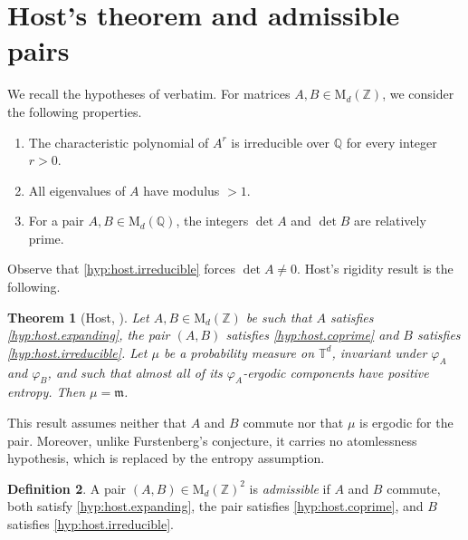 \documentclass[11pt,reqno]{amsart}
\theoremstyle{plain}
\newtheorem{thm}{Theorem}[section]
\theoremstyle{definition}
\newtheorem{dft}[thm]{Definition}
\newcommand{\T}{\mathbb{T}}
\newcommand{\Z}{\mathbb{Z}}
\newcommand{\Q}{\mathbb{Q}}
\newcommand{\Leb}{\mathfrak{m}}
\begin{document}
\section{Host's theorem and admissible pairs}
    \label{sec:pairs}
We recall the hypotheses of \cite{host_uniform_2000} verbatim.
For matrices \( A, B \in\mathrm M_d(\Z) \), we consider the following properties.
\begin{enumerate}[label=\textup{(H\arabic*)}, ref=(H\arabic*), start=1]
    \item \label{hyp:host.irreducible}
        The characteristic polynomial of \(A^r\) is irreducible over \(\Q\) for every integer \(r>0\).
    \item \label{hyp:host.expanding}
        All eigenvalues of \(A\) have modulus \(>1\).
    \item \label{hyp:host.coprime}
        For a pair \(A,B\in\mathrm{M}_d(\Q)\), the integers \(\det A\) and \(\det B\) are relatively prime.
\end{enumerate}
Observe that \ref{hyp:host.irreducible} forces \( \det A\neq0 \).
Host's rigidity result is the following.

\begin{thm}[Host, {\cite[Theorem 3]{host_uniform_2000}}]
\label{thm:host.rigidity}
    Let \( A,B\in\mathrm M_d(\Z) \) be such that \( A \) satisfies \ref{hyp:host.expanding}, the pair \( (A,B) \) satisfies \ref{hyp:host.coprime} and \( B \) satisfies \ref{hyp:host.irreducible}.
    Let \( \mu \) be a probability measure on \( \T^d \), invariant under \( \varphi_A \) and \( \varphi_B \), and such that almost all of its \( \varphi_A \)-ergodic components have positive entropy.
    Then \( \mu=\Leb \).
\end{thm}
This result assumes neither that \( A \) and \( B \) commute nor that \( \mu \) is ergodic for the pair.
Moreover, unlike Furstenberg's conjecture, it carries no atomlessness hypothesis, which is replaced by the entropy assumption.

\begin{dft}
\label{dft:admissible.pair}
    A pair \( (A,B)\in\mathrm M_d(\Z)^2 \) is \emph{admissible} if \( A \) and \( B \) commute, both satisfy \ref{hyp:host.expanding}, the pair satisfies \ref{hyp:host.coprime}, and \( B \) satisfies \ref{hyp:host.irreducible}.
\end{dft}
\end{document}
